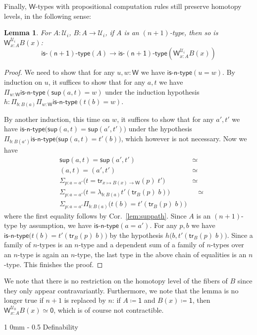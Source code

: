 \documentclass[reqno,10pt,a4paper,oneside]{amsart}
\makeatletter
\newcommand{\prd}[1]{\Pi_{#1}}
\newcommand{\sm}[1]{\Sigma_{#1}}
\newcommand{\lam}[1]{\lambda_{#1}}
\newcommand{\defeq}{\coloneqq}
\newcommand{\W}{\mathsf{W}}
\newcommand{\wsup}{\mathsf{sup}}
\newcommand{\one}{\mathsf{1}}
\newcommand{\zero}{\mathsf{0}}
\newcommand{\UU}{\mathcal{U}}
\newcommand{\isntype}[1]{\mathsf{is}\text{-}\mathsf{#1}\text{-}\mathsf{type}}
\newcommand{\trans}{\mathsf{tr}}
\renewcommand{\section}{\@startsection
  {section}%
   {1}%
  {0mm}%
   {-\baselineskip}%
  {0.5\baselineskip}%
   {\Large\bfseries}}%
\numberwithin{equation}{section}
\theoremstyle{mythm}
\newtheorem{lemma}[theorem]{Lemma}
\theoremstyle{mydef}
\theoremstyle{myrmk}
\makeatother
\begin{document}
Finally, $\W$-types with propositional computation rules still preserve homotopy levels, in the following sense:
\begin{lemma}
For $A:\UU_i$, $B : A \to \UU_i$, if $A$ is an $(n+1)$-type, then so is $\W^{\UU_i}_{x:A} B(x)$:
\[ \isntype{(n+1)}(A) \to \isntype{(n+1)}(\W^{\UU_i}_{x:A} B(x))\]
\end{lemma}
\begin{proof}
We need to show that for any $u,w : \W$ we have $\isntype{n}(u = w)$. By induction on $u$, it suffices to show that for any $a,t$ we have $\prd{w:\W} \isntype{n}(\wsup(a,t) = w)$ under the induction hypothesis $h : \prd{b:B(a)}\prd{w:\W} \isntype{n}(t(b) = w)$. 

By another induction, this time on $w$, it suffices to show that for any $a',t'$ we have
$\isntype{n}\big(\wsup(a,t) = \wsup(a',t')\big)$ under the hypothesis $\prd{b:B(a')} \isntype{n}\big(\wsup(a,t) = t'(b)\big)$, which however is not necessary. Now we have
\begin{alignat*}{4}
& \wsup(a,t) = \wsup(a',t') & \simeq \\
& (a,t) = (a',t') & \simeq \\
& \sm{p : a = a'} \big(t = \trans_{x \mapsto B(x) \to \W}(p) \; t'\big) & \simeq \\
& \sm{p : a = a'} \big(t = \lam{b:B(a)} t'(\trans_B(p) \; b)\big) & \;\;\; \simeq \\
& \sm{p : a = a'}\prd{b:B(a)} \big(t(b) = t'(\trans_B(p) \; b)\big) & \;\;\;
\end{alignat*}
where the first equality follows by Cor.~\ref{lem:suppath}. Since $A$ is an $(n+1)$-type by assumption, we have $\isntype{n}(a=a')$. For any $p,b$ we have $\isntype{n}\big(t(b) = t'(\trans_B(p) \; b)\big)$ by the hypothesis $h\big(b,t'(\trans_B(p) \; b)\big)$. Since a family of $n$-types is an $n$-type and a dependent sum of a family of $n$-types over an $n$-type is again an $n$-type, the last type in the above chain of equalities is an $n$-type. This finishes the proof.
\end{proof}

We note that there is no restriction on the homotopy level of the fibers of $B$ since they only appear contravariantly. Furthermore, we note that the lemma is no longer true if $n+1$ is replaced by $n$: if $A \defeq \one$ and $B(x) \defeq \one$, then $\W^{\UU_0}_{x:A} B(x) \simeq \zero$, which is of course not contractible. 


\section{Definability}
\label{sec:definability}
\end{document}
